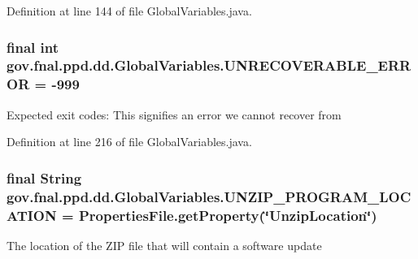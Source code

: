 Definition at line 144 of file Global\-Variables.\-java.

\hypertarget{classgov_1_1fnal_1_1ppd_1_1dd_1_1GlobalVariables_af2d69bd16e463355307ead1135160408}{
\subsubsection[{U\-N\-R\-E\-C\-O\-V\-E\-R\-A\-B\-L\-E\-\_\-\-E\-R\-R\-O\-R}]{\setlength{\rightskip}{0pt plus 5cm}final int gov.\-fnal.\-ppd.\-dd.\-Global\-Variables.\-U\-N\-R\-E\-C\-O\-V\-E\-R\-A\-B\-L\-E\-\_\-\-E\-R\-R\-O\-R = -\/999\hspace{0.3cm}{\ttfamily [static]}}}\label{classgov_1_1fnal_1_1ppd_1_1dd_1_1GlobalVariables_af2d69bd16e463355307ead1135160408}
Expected exit codes\-: This signifies an error we cannot recover from 

Definition at line 216 of file Global\-Variables.\-java.

\hypertarget{classgov_1_1fnal_1_1ppd_1_1dd_1_1GlobalVariables_a3b3484a9eaa4099af2a1ade1fa0f94a5}{
\subsubsection[{U\-N\-Z\-I\-P\-\_\-\-P\-R\-O\-G\-R\-A\-M\-\_\-\-L\-O\-C\-A\-T\-I\-O\-N}]{\setlength{\rightskip}{0pt plus 5cm}final String gov.\-fnal.\-ppd.\-dd.\-Global\-Variables.\-U\-N\-Z\-I\-P\-\_\-\-P\-R\-O\-G\-R\-A\-M\-\_\-\-L\-O\-C\-A\-T\-I\-O\-N = {\bf Properties\-File.\-get\-Property}(\char`\"{}Unzip\-Location\char`\"{})\hspace{0.3cm}{\ttfamily [static]}}}\label{classgov_1_1fnal_1_1ppd_1_1dd_1_1GlobalVariables_a3b3484a9eaa4099af2a1ade1fa0f94a5}
The location of the Z\-I\-P file that will contain a software update 

